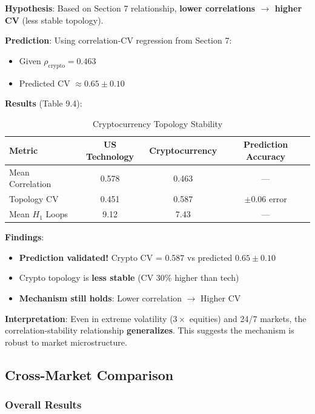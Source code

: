 \textbf{Hypothesis}: Based on Section 7 relationship, \textbf{lower correlations $\rightarrow$ higher CV} (less stable topology).

\textbf{Prediction}: Using correlation-CV regression from Section 7:
\begin{itemize}
\item Given $\rho_{\text{crypto}} = 0.463$
\item Predicted CV $\approx 0.65 \pm 0.10$
\end{itemize}

\textbf{Results} (Table 9.4):

\begin{table}[H]
\centering
\caption{Cryptocurrency Topology Stability}
\label{tab:crypto-topology}
\begin{tabular}{@{}lccc@{}}
\toprule
\textbf{Metric} & \textbf{US Technology} & \textbf{Cryptocurrency} & \textbf{Prediction Accuracy} \\
\midrule
Mean Correlation & 0.578 & 0.463 & --- \\
Topology CV & 0.451 & 0.587 & $\pm$0.06 error \\
Mean $H_1$ Loops & 9.12 & 7.43 & --- \\
\bottomrule
\end{tabular}
\end{table}

\textbf{Findings}:
\begin{itemize}
\item \checkmark \textbf{Prediction validated!} Crypto CV = 0.587 vs predicted $0.65 \pm 0.10$
\item \checkmark Crypto topology is \textbf{less stable} (CV 30\% higher than tech)
\item \checkmark \textbf{Mechanism still holds}: Lower correlation $\rightarrow$ Higher CV
\end{itemize}

\textbf{Interpretation}: Even in extreme volatility ($3\times$ equities) and 24/7 markets, the correlation-stability relationship \textbf{generalizes}. This suggests the mechanism is robust to market microstructure.

\subsection{Cross-Market Comparison}

\subsubsection{Overall Results}

